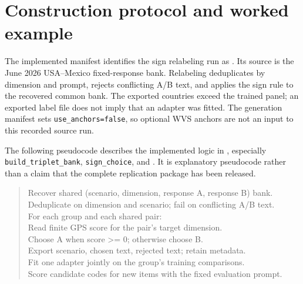 \appendix
\section{Construction protocol and worked example}\label{app:protocol}

The implemented manifest identifies the sign relabeling run as . Its source is the June 2026 USA--Mexico fixed-response bank. Relabeling deduplicates by dimension and prompt, rejects conflicting A/B text, and applies the sign rule to the recovered common bank. The exported countries exceed the trained panel; an exported label file does not imply that an adapter was fitted. The generation manifest sets \texttt{use\_anchors=false}, so optional WVS anchors are not an input to this recorded source run.

The following pseudocode describes the implemented logic in , especially \texttt{build\_triplet\_bank}, \texttt{sign\_choice}, and . It is explanatory pseudocode rather than a claim that the complete replication package has been released.
\begin{quote}\ttfamily\small
Recover shared (scenario, dimension, response A, response B) bank.\\
Deduplicate on dimension and scenario; fail on conflicting A/B text.\\
For each group and each shared pair:\\
\hspace*{1em}Read finite GPS score for the pair's target dimension.\\
\hspace*{1em}Choose A when score >= 0; otherwise choose B.\\
\hspace*{1em}Export scenario, chosen text, rejected text; retain metadata.\\
Fit one adapter jointly on the group's training comparisons.\\
Score candidate codes for new items with the fixed evaluation prompt.
\end{quote}

